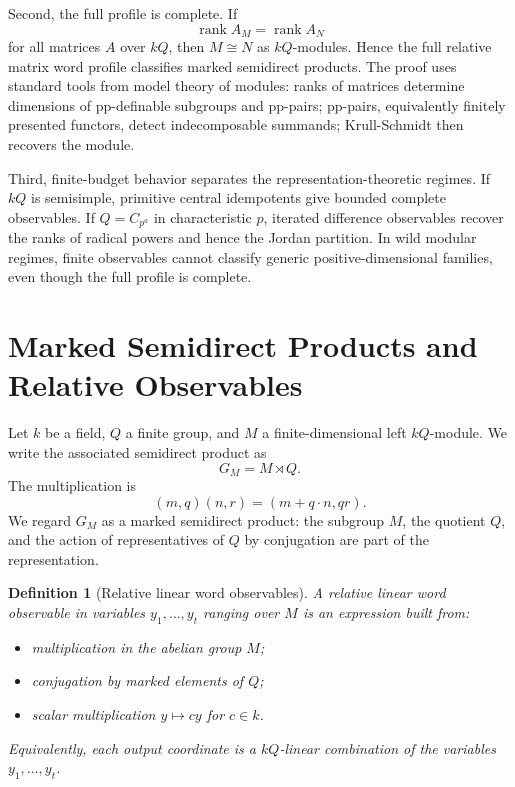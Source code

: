 \documentclass[11pt]{article}
\newtheorem{definition}[theorem]{Definition}
\begin{document}
Second, the full profile is complete. If
\[
\operatorname{rank}A_M=\operatorname{rank}A_N
\]
for all matrices $A$ over $kQ$, then $M\cong N$ as $kQ$-modules. Hence the full relative matrix word profile classifies marked semidirect products. The proof uses standard tools from model theory of modules: ranks of matrices determine dimensions of pp-definable subgroups and pp-pairs; pp-pairs, equivalently finitely presented functors, detect indecomposable summands; Krull-Schmidt then recovers the module.

Third, finite-budget behavior separates the representation-theoretic regimes. If $kQ$ is semisimple, primitive central idempotents give bounded complete observables. If $Q=C_{p^a}$ in characteristic $p$, iterated difference observables recover the ranks of radical powers and hence the Jordan partition. In wild modular regimes, finite observables cannot classify generic positive-dimensional families, even though the full profile is complete.

\section{Marked Semidirect Products and Relative Observables}

Let $k$ be a field, $Q$ a finite group, and $M$ a finite-dimensional left $kQ$-module. We write the associated semidirect product as
\[
G_M=M\rtimes Q.
\]
The multiplication is
\[
(m,q)(n,r)=(m+q\cdot n,qr).
\]
We regard $G_M$ as a marked semidirect product: the subgroup $M$, the quotient $Q$, and the action of representatives of $Q$ by conjugation are part of the representation.

\begin{definition}[Relative linear word observables]
A relative linear word observable in variables $y_1,\ldots,y_t$ ranging over $M$ is an expression built from:
\begin{itemize}
\item multiplication in the abelian group $M$;
\item conjugation by marked elements of $Q$;
\item scalar multiplication $y\mapsto cy$ for $c\in k$.
\end{itemize}
Equivalently, each output coordinate is a $kQ$-linear combination of the variables $y_1,\ldots,y_t$.
\end{definition}
\end{document}
